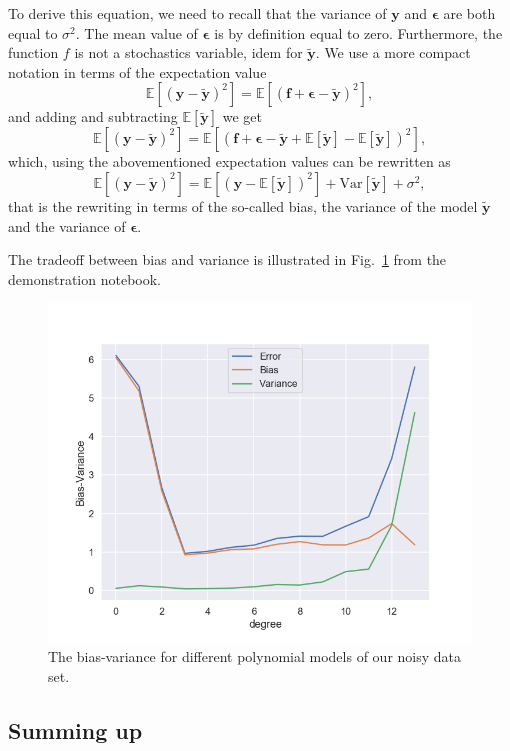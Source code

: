 \documentclass[%
oneside,                 %
final,                   %
10pt]{article}
\begin{document}
To derive this equation, we need to recall that the variance of $\bm{y}$ and $\bm{\epsilon}$ are both equal to $\sigma^2$. The mean value of $\bm{\epsilon}$ is by definition equal to zero. Furthermore, the function $f$ is not a stochastics variable, idem for $\bm{\tilde{y}}$.
We use a more compact notation in terms of the expectation value 
\[
\mathbb{E}\left[(\bm{y}-\bm{\tilde{y}})^2\right]=\mathbb{E}\left[(\bm{f}+\bm{\epsilon}-\bm{\tilde{y}})^2\right],
\]
and adding and subtracting $\mathbb{E}\left[\bm{\tilde{y}}\right]$ we get
\[
\mathbb{E}\left[(\bm{y}-\bm{\tilde{y}})^2\right]=\mathbb{E}\left[(\bm{f}+\bm{\epsilon}-\bm{\tilde{y}}+\mathbb{E}\left[\bm{\tilde{y}}\right]-\mathbb{E}\left[\bm{\tilde{y}}\right])^2\right],
\]
which, using the abovementioned expectation values can be rewritten as 
\[
\mathbb{E}\left[(\bm{y}-\bm{\tilde{y}})^2\right]=\mathbb{E}\left[(\bm{y}-\mathbb{E}\left[\bm{\tilde{y}}\right])^2\right]+\mathrm{Var}\left[\bm{\tilde{y}}\right]+\sigma^2,
\]
that is the rewriting in terms of the so-called bias, the variance of the model $\bm{\tilde{y}}$ and the variance of $\bm{\epsilon}$.

The tradeoff between bias and variance is illustrated in Fig.~\ref{fig-bias_variance} from the demonstration notebook.


\begin{figure}[!ht]  %
  \centerline{\includegraphics[width=0.8\linewidth]{fig/bias_variance.png}}
  \caption{
  The bias-variance for different polynomial models of our noisy data set. \label{fig-bias_variance}
  }
\end{figure}



\subsection{Summing up}
\end{document}
